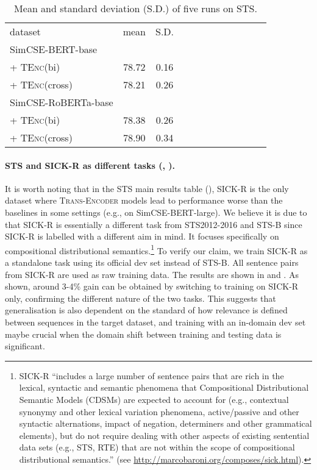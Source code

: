 \documentclass{article} \usepackage{iclr2021_conference,times}
\newcommand{\modelname}{\textsc{Trans-Encoder}\xspace}
\newcommand{\tenc}{\textsc{TEnc}\xspace}
\begin{document}
\begin{table}[!t] \setlength{\tabcolsep}{3.6pt}
\centering
\begin{tabular}{lccccccccccc}
\cmidrule[1.5pt]{1-10}
 dataset  & mean & S.D. & \\
\cmidrule[1.0pt]{1-10}
 SimCSE-BERT-base \\
 + \tenc (bi) & 78.72 & 0.16 \\
 + \tenc (cross) & 78.21 & 0.26  \\
  \cmidrule[.5pt]{1-10}
 SimCSE-RoBERTa-base     \\
 + \tenc (bi) & 78.38 & 0.26 \\
 + \tenc (cross) &  78.90 & 0.34  \\
  \cmidrule[1.5pt]{1-10}
\end{tabular}
\caption{Mean and standard deviation (S.D.) of five runs on STS.}
\label{tab:standard_sd}
\end{table}


\paragraph{STS and SICK-R as different tasks (, ).}
It is worth noting that in the STS main results table (), SICK-R is the only dataset where \modelname models lead to performance worse than the baselines in some settings (e.g., on SimCSE-BERT-large). We believe it is due to that SICK-R is essentially a different task from STS2012-2016 and STS-B since SICK-R is labelled with a different aim in mind. It focuses specifically on compositional distributional semantics.\footnote{SICK-R ``includes a large number of sentence pairs that are rich in the lexical, syntactic and semantic phenomena that Compositional Distributional Semantic Models (CDSMs) are expected to account for (e.g., contextual synonymy and other lexical variation phenomena, active/passive and other syntactic alternations, impact of negation, determiners and other grammatical elements), but do not require dealing with other aspects of existing sentential data sets (e.g., STS, RTE) that are not within the scope of compositional distributional semantics.'' (see \url{http://marcobaroni.org/composes/sick.html}).} To verify our claim, we train SICK-R as a standalone task using its official dev set instead of STS-B. All sentence pairs from SICK-R are used as raw training data. 
The results are shown in  and . 
As shown, around 3-4\% gain can be obtained by switching to training on SICK-R only, confirming the different nature of the two tasks. 
This suggests that generalisation is also dependent on the standard of how relevance is defined between sequences in the target dataset, and training with an in-domain dev set maybe crucial when the domain shift between training and testing data is significant.
\end{document}
